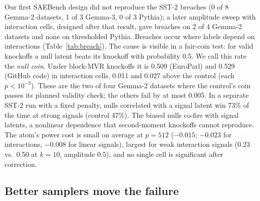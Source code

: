 Our first SAEBench design did not reproduce the SST-2 breaches (0 of 8 Gemma-2 datasets, 1 of 3 Gemma-3, 0 of 3 Pythia);
a later amplitude sweep with interaction cells, designed after that result, gave breaches on 2 of 4 Gemma-2 datasets and none on
thresholded Pythia. Breaches occur where labels depend on interactions (Table~\ref{tab:breach}). The cause is visible in a
fair-coin test: for valid knockoffs a null latent beats its knockoff with probability 0.5. We call
this rate the \emph{null coin}. Under block-MVR knockoffs it is 0.509 (EuroParl) and 0.529 (GitHub code) in interaction
cells, 0.011 and 0.027 above the control (each $p<10^{-3}$). These are the two of four Gemma-2 datasets where
the control's coin passes its planned validity check; the others fail by at most 0.005. In a separate SST-2 run with a fixed penalty, nulls correlated with a signal latent win 73\% of the time at strong
signals (control 47\%). The biased nulls co-fire with signal latents, a nonlinear dependence that
second-moment knockoffs cannot reproduce. The atom's power cost is small on average at $p = 512$ ($-0.015$; $-0.023$ for interactions, $-0.008$ for linear signals), largest for weak interaction signals (0.23 vs.\ 0.50 at $k = 10$, amplitude 0.5), and no single cell is significant after correction.

\subsection{Better samplers move the failure}
\label{sec:samplers}

\begin{table}[t]
\centering
\small
\setlength{\tabcolsep}{3pt}
\caption{Knockoff samplers on SAEBench (Gemma-2: 8 datasets + 2 sweep; Pythia: 3). Breaching: settings
with any BY breach. Hurdle breaches: Pythia 4, 7, 16 cells (0, 0, 4 after JumpReLU-style thresholding)
and one Gemma-2 cell. Binarised: 2 of 54 cells exceed $q$ before correction, none after.
$^\dagger$All 2,048 latents swapped.}
\label{tab:samplers}
\end{table}

